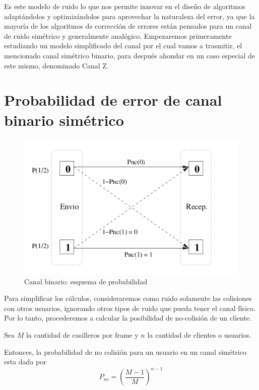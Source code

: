 Es este modelo de ruido lo que nos permite innovar en el diseño de algoritmos adaptándolos y optimizándolos para aprovechar la naturaleza del error, ya que la mayoría de los algoritmos de corrección de errores están pensados para un canal de ruido simétrico y generalmente analógico.
Empezaremos primeramente estudiando un modelo simplificado del canal por el cual vamos a trasmitir, el mencionado canal simétrico binario, para después ahondar en un caso especial de este mismo, denominado Canal Z.

\section{Probabilidad de error de canal binario simétrico}

\begin{figure}[t]
  \begin{center}
    \includegraphics[scale=0.60]{graphs/canalBinario.png}
  \end{center}
\caption {Canal binario: esquema de probabilidad}
\label{fig:canbin}
\end{figure}

Para simplificar los cálculos, consideraremos como ruido solamente las colisiones con otros usuarios, ignorando otros tipos de ruido que pueda tener el canal físico. Por lo tanto, procederemos a calcular la posibilidad de no-colisión de un cliente.

Sea $M$ la cantidad de casilleros por frame y $n$ la cantidad de clientes o usuarios.

Entonces, la probabilidad de no colisión para un usuario en un canal simétrico esta dada por
\begin{equation}
P_{nc}=\left(\frac{M-1}{M}\right)^{n-1}
\end{equation}


